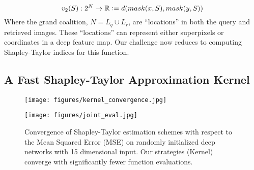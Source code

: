 \documentclass{article} %
\newcommand{\defeq}{\vcentcolon=}
\begin{document}
\vspace{-.05in}
\begin{equation}
    \label{eq:second-order}
    v_{2}(S): 2^N \to \mathbb{R} \defeq d(mask(x, S), mask(y, S))
\end{equation} 
 Where the grand coalition, $N = L_q \cup L_r$, are ``locations'' in both the query and retrieved images. These ``locations'' can represent either superpixels or coordinates in a deep feature map. Our challenge now reduces to computing Shapley-Taylor indices for this function.
 \vspace{-.1in}
 \subsection{A Fast Shapley-Taylor Approximation Kernel} 
 \label{sec:so-kernel}
 \vspace{-.1in}

\begin{figure}
\centering
\begin{minipage}[t]{.48\textwidth}
    \centering
    \texttt{[image: figures/kernel\_convergence.jpg]}
    \vspace{-.05in}
    \caption{Convergence of Shapley-Taylor estimation schemes with respect to the Mean Squared Error (MSE) on randomly initialized deep networks with 15 dimensional input. Our strategies (Kernel) converge with significantly fewer function evaluations.}
    \label{fig:kernel-speedup}
\end{minipage}%
\hspace{.01\textwidth}
\begin{minipage}[t]{.48\textwidth}
  \centering
    \texttt{[image: figures/joint\_eval.jpg]}
    \vspace{-.2in}
    \label{fig:joint-eval}
\end{minipage}
\vspace{-.1in}
\end{figure}
\end{document}
